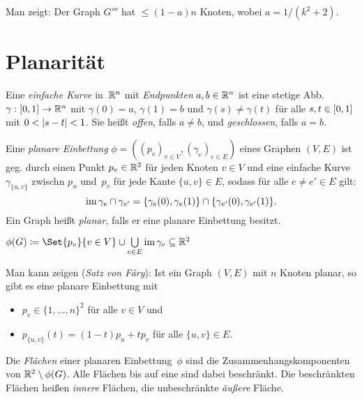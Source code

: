 \documentclass{cheat-sheet}
\begin{document}
\begin{bem}
  Man zeigt: Der Graph $G'''$ hat $\leq (1-a) n$ Knoten, wobei $a = 1 / (k^2 + 2)$.
\end{bem}

\section{Planarität}


\begin{defn}
  Eine \emph{einfache Kurve} in~$\mathbb{R}^n$ mit \textit{Endpunkten} $a, b \in \mathbb{R}^n$ ist eine stetige Abb. $\gamma : \left[ 0, 1 \right] \to \mathbb{R}^n$ mit $\gamma(0) = a$, $\gamma(1) = b$ und $\gamma(s) \neq \gamma(t)$ für alle $s, t \in \left[ 0, 1 \right]$ mit $0 < \lvert s - t\rvert < 1$.
  Sie heißt \emph{offen}, falls $a \neq b$, und \emph{geschlossen}, falls $a = b$.
\end{defn}

\begin{defn}
  Eine \emph{planare Einbettung} $\phi = ((p_v)_{v \in V}, (\gamma_e)_{e \in E})$ eines Graphen $(V, E)$ ist geg. durch einen Punkt $p_v \in \mathbb{R}^2$ für jeden Knoten $v \in V$ und eine einfache Kurve $\gamma_{\{ u, v \}}$ zwischn $p_u$ und~$p_v$ für jede Kante $\{ u, v \} \in E$, sodass für alle $e \neq e' \in E$ gilt:
  \[
    \operatorname{im} \gamma_e \cap \gamma_{e'} = \{ \gamma_e(0), \gamma_e(1) \} \cap \{ \gamma_{e'}(0), \gamma_{e'}(1) \}.
  \]
  Ein Graph heißt \emph{planar}, falls er eine planare Einbettung besitzt.
\end{defn}

\begin{nota}
  $\phi(G) \coloneqq \Set{p_v}{v \in V} \cup \bigcup_{e \in E} \im \gamma_e \subseteq \R^2$
\end{nota}

\begin{bem}
  Man kann zeigen (\textit{Satz von Fáry}): Ist ein Graph $(V, E)$ mit $n$ Knoten planar, so gibt es eine planare Einbettung mit
  \begin{itemize}
    \item $p_v \in \{1, \ldots, n\}^2$ für alle $v \in V$ und
    \item $p_{\{u, v\}}(t) = (1-t) p_u + t p_v$ für alle $\{u, v\} \in E$.
  \end{itemize}
\end{bem}

\begin{defn}
  Die \emph{Flächen} einer planaren Einbettung~$\phi$ sind die Zusammenhangskomponenten von $\mathbb{R}^2 \setminus \phi(G)$.
  Alle Flächen bis auf eine sind dabei beschränkt.
  Die beschränkten Flächen heißen \textit{innere} Flächen, die unbeschränkte \textit{äußere} Fläche.
\end{defn}
\end{document}
